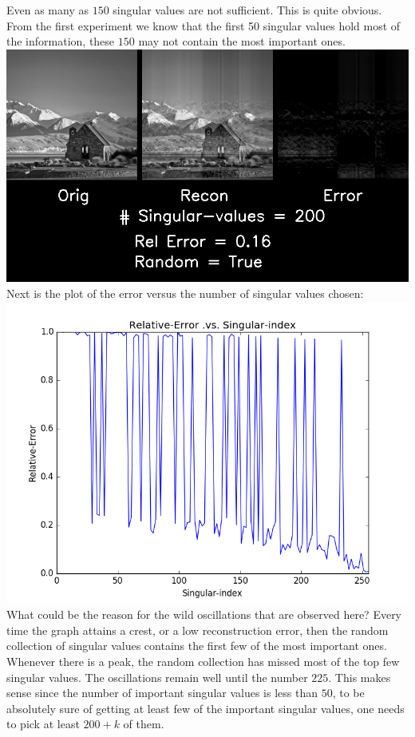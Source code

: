 \documentclass{article}
\begin{document}
Even as many as $150$ singular values are not sufficient. This is quite obvious. From the first experiment we know that the first 50 singular values hold most of the information, these $150$ may not contain the most important ones.\\

\includegraphics[width =\textwidth]{SVD/a/Square/True/recon0200.png}\\

Next is the plot of the error versus the number of singular values chosen:\\

\includegraphics[width =\textwidth]{SVD/a/Square/True/error.png}\\

What could be the reason for the wild oscillations that are observed here? Every time the graph attains a crest, or a low reconstruction error, then the random collection of singular values contains the first few of the most important ones. Whenever there is a peak, the random collection has missed most of the top few singular values. The oscillations remain well until the number $225$. This makes sense since the number of important singular values is less than $50$, to be absolutely sure of getting at least few of the important singular values, one needs to pick at least $200 + k$ of them.
\end{document}
